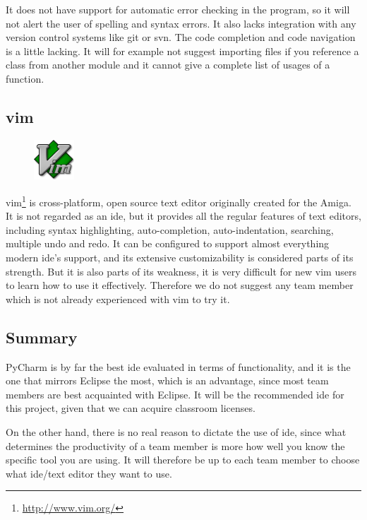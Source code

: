 It does not have support for automatic error checking in the program, so it
will not alert the user of spelling and syntax errors. It also lacks integration
with any version control systems like git or svn. The code completion and
code navigation is a little lacking. It will for example not suggest importing
files if you reference a class from another module and it cannot give a
complete list of usages of a function.

\subsection{\gls{vim}}
\begin{figure}
	\vspace{-20pt}
	\includegraphics[width=1.5cm]{./planning/img/vim_logo}
	\vspace{-20pt}
\end{figure}
\gls{vim}\footnote{\url{http://www.vim.org/}} is cross-platform, open source text
editor originally created for the Amiga. It is not regarded as an \Gls{ide}, but it
provides all the regular features of text editors, including syntax
highlighting, auto-completion, auto-indentation, searching, multiple undo and
redo. It can be configured to support almost everything modern \Gls{ide}’s support,
and its extensive customizability is considered parts of its strength. But it
is also parts of its weakness, it is very difficult for new \gls{vim} users to learn
how to use it effectively. Therefore we do not suggest any team member which is
not already experienced with \gls{vim} to try it.

\subsection{Summary}
PyCharm is by far the best \Gls{ide} evaluated in terms of functionality, and it is
the one that mirrors \Gls{Eclipse} the most, which is an advantage, since most team
members are best acquainted with \Gls{Eclipse}. It will be the recommended \Gls{ide} for
this project, given that we can acquire classroom licenses.

On the other hand, there is no real reason to dictate the use of \Gls{ide}, since
what determines the productivity of a team member is more how well you know
the specific tool you are using. It will therefore be up to each team member
to choose what \Gls{ide}/text editor they want to use.


